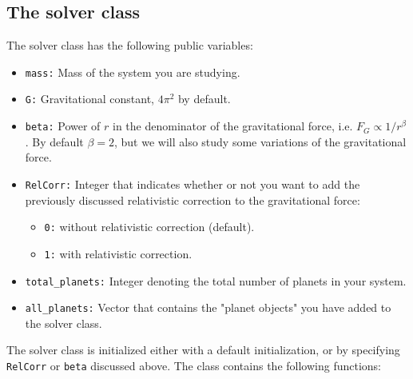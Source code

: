 \documentclass[12pt, a4paper]{article}
\begin{document}
\subsection{The solver class}

The solver class has the following public variables: 
\begin{itemize}
\item \texttt{mass:} Mass of the system you are studying. 
\item \texttt{G:} Gravitational constant, $4\pi^2$ by default. 
\item \texttt{beta:} Power of $r$ in the denominator of the gravitational force, i.e. 
$F_G \propto 1/r^{\beta}$. By default $\beta = 2$, but we will also study some variations of the 
gravitational force. 
\item \texttt{RelCorr:} Integer that indicates whether or not you want to add the previously discussed 
relativistic correction to the gravitational force:
\begin{itemize}
\item \texttt{0:} without relativistic correction (default). 
\item \texttt{1:} with relativistic correction. 
\end{itemize}  
\item \texttt{total\_planets:} Integer denoting the total number of planets in your system. 
\item \texttt{all\_planets:} Vector that contains the "planet objects" you have added to the solver class. 
\end{itemize}
The solver class is initialized either with a default initialization, or by specifying \texttt{RelCorr} 
or \texttt{beta} discussed above. The class contains the following functions: 
\end{document}
